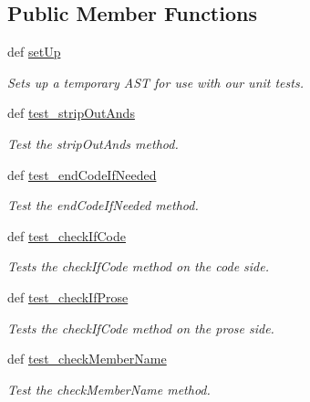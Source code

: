 \subsection*{Public Member Functions}
\begin{DoxyCompactItemize}
\item 
def \hyperlink{classdoxypypy_1_1test_1_1test__doxypypy_1_1_test_doxypypy_a2799b5784b28a2c99cdd797e9df514da}{set\-Up}
\begin{DoxyCompactList}\small\item\em Sets up a temporary A\-S\-T for use with our unit tests. \end{DoxyCompactList}\item 
def \hyperlink{classdoxypypy_1_1test_1_1test__doxypypy_1_1_test_doxypypy_a49f02bd04b2aa5ca55ad9a8973aac063}{test\-\_\-strip\-Out\-Ands}
\begin{DoxyCompactList}\small\item\em Test the strip\-Out\-Ands method. \end{DoxyCompactList}\item 
def \hyperlink{classdoxypypy_1_1test_1_1test__doxypypy_1_1_test_doxypypy_a109bde0adec6120e1efd7b7d009ea337}{test\-\_\-end\-Code\-If\-Needed}
\begin{DoxyCompactList}\small\item\em Test the end\-Code\-If\-Needed method. \end{DoxyCompactList}\item 
def \hyperlink{classdoxypypy_1_1test_1_1test__doxypypy_1_1_test_doxypypy_a1e8174b2c4581a3eeff286faa7dbe464}{test\-\_\-check\-If\-Code}
\begin{DoxyCompactList}\small\item\em Tests the check\-If\-Code method on the code side. \end{DoxyCompactList}\item 
def \hyperlink{classdoxypypy_1_1test_1_1test__doxypypy_1_1_test_doxypypy_ab0261c2b9d8cfe1a63c4970ec38eb8a5}{test\-\_\-check\-If\-Prose}
\begin{DoxyCompactList}\small\item\em Tests the check\-If\-Code method on the prose side. \end{DoxyCompactList}\item 
def \hyperlink{classdoxypypy_1_1test_1_1test__doxypypy_1_1_test_doxypypy_a06fb229f68fe090a28225e92a500a82c}{test\-\_\-check\-Member\-Name}
\begin{DoxyCompactList}\small\item\em Test the check\-Member\-Name method. \end{DoxyCompactList}\item 

\end{DoxyCompactItemize}
